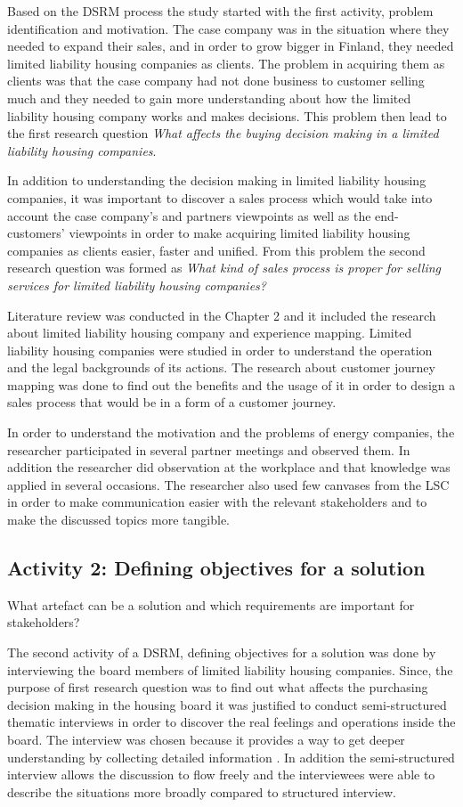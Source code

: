 Based on the DSRM process the study started with the first activity, problem identification and motivation. The case company was in the situation where they needed to expand their sales, and in order to grow bigger in Finland, they needed limited liability housing companies as clients. The problem in acquiring them as clients was that the case company had not done business to customer selling much and they needed to gain more understanding about how the limited liability housing company works and makes decisions. This problem then lead to the first research question \emph{What affects the buying decision making in a limited liability housing companies}.

In addition to understanding the decision making in limited liability housing companies, it was important to discover a sales process which would take into account the case company's and partners viewpoints as well as the end-customers' viewpoints in order to make acquiring limited liability housing companies as clients easier, faster and unified. From this problem the second research question was formed as \emph{What kind of sales process is proper for selling services for limited liability housing companies?}

Literature review was conducted in the Chapter 2 and it included  the research about limited liability housing company and experience mapping. Limited liability housing companies were studied in order to understand the operation and the legal backgrounds of its actions. The research about customer journey mapping was done to find out the benefits and the usage of it in order to design a sales process that would be in a form of a customer journey.

In order to understand the motivation and the problems of energy companies, the researcher participated in several partner meetings and observed them. In addition the researcher did observation at the workplace and that knowledge was applied in several occasions. The researcher also used few canvases from the LSC in order to make communication easier with the relevant stakeholders and to make the discussed topics more tangible.

\subsection{Activity 2: Defining objectives for a solution}
What artefact can be a solution and which requirements are important for stakeholders?

The second activity of a DSRM, defining objectives for a solution was done by interviewing the board members of limited liability housing companies. Since, the purpose of first research question was to find out what affects the purchasing decision making in the housing board it was justified to conduct semi-structured thematic interviews in order to discover the real feelings and operations inside the board. The interview was chosen because it provides a way to get deeper understanding by collecting detailed information \parencite{Johannesson:2014}. In addition the semi-structured interview allows the discussion to flow freely and the interviewees were able to describe the situations more broadly compared to structured interview.

